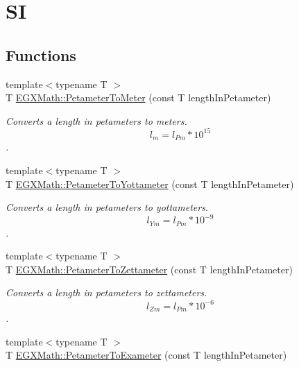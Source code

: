 \hypertarget{group___e_g_x_math-_conversions-_length_conversions-_s_i-_petameter-_s_i}{}\section{SI}
\label{group___e_g_x_math-_conversions-_length_conversions-_s_i-_petameter-_s_i}
\subsection*{Functions}
\begin{DoxyCompactItemize}
\item 
{\footnotesize template$<$typename T $>$ }\\T \mbox{\hyperlink{group___e_g_x_math-_conversions-_length_conversions-_s_i-_petameter-_s_i_ga604a637d8bd107a2eaa162757b2e813b}{E\+G\+X\+Math\+::\+Petameter\+To\+Meter}} (const T length\+In\+Petameter)
\begin{DoxyCompactList}\small\item\em Converts a length in petameters to meters. \[ l_{m}=l_{Pm} * 10^{15} \]. \end{DoxyCompactList}\item 
{\footnotesize template$<$typename T $>$ }\\T \mbox{\hyperlink{group___e_g_x_math-_conversions-_length_conversions-_s_i-_petameter-_s_i_ga9ffc5119dfdd8427918e9f6cd6e4c2c8}{E\+G\+X\+Math\+::\+Petameter\+To\+Yottameter}} (const T length\+In\+Petameter)
\begin{DoxyCompactList}\small\item\em Converts a length in petameters to yottameters. \[ l_{Ym}=l_{Pm} * 10^{-9} \]. \end{DoxyCompactList}\item 
{\footnotesize template$<$typename T $>$ }\\T \mbox{\hyperlink{group___e_g_x_math-_conversions-_length_conversions-_s_i-_petameter-_s_i_gabea28636f814fa1d8a3ce9590478e3e4}{E\+G\+X\+Math\+::\+Petameter\+To\+Zettameter}} (const T length\+In\+Petameter)
\begin{DoxyCompactList}\small\item\em Converts a length in petameters to zettameters. \[ l_{Zm}=l_{Pm} * 10^{-6} \]. \end{DoxyCompactList}\item 
{\footnotesize template$<$typename T $>$ }\\T \mbox{\hyperlink{group___e_g_x_math-_conversions-_length_conversions-_s_i-_petameter-_s_i_gade75826e3cd26e484252c5d5a9d1bf8c}{E\+G\+X\+Math\+::\+Petameter\+To\+Exameter}} (const T length\+In\+Petameter)

\end{DoxyCompactItemize}

